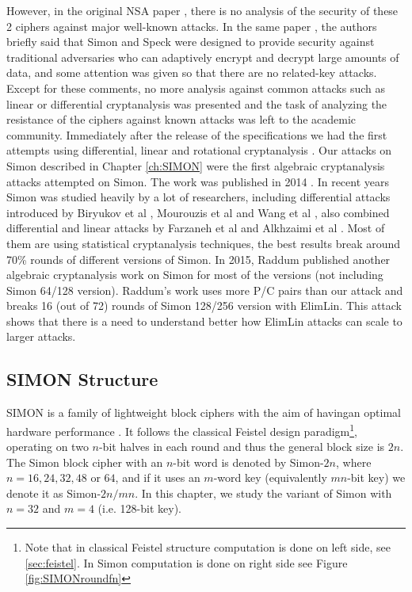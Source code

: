 However, in the original NSA paper \cite{NSAciphers}, there is no analysis of the security of these 2 ciphers against major well-known attacks. In the same paper \cite{NSAciphers}, the authors briefly said that Simon and Speck were designed to provide security against traditional adversaries who can adaptively encrypt and decrypt large amounts of data, and some attention was given so that there are no related-key attacks. Except for these comments, no more analysis against common attacks such as linear or differential cryptanalysis was presented and the task of analyzing the resistance of the ciphers against known attacks was left to the academic community. Immediately after the release of the specifications we had the first attempts using differential, linear and rotational cryptanalysis \cite{simon1,simon2}. Our attacks on Simon described in Chapter \ref{ch:SIMON} were the first algebraic cryptanalysis attacks attempted on Simon. The work was published in 2014 \cite{courtois2014combined}. In recent years Simon was studied heavily by a lot of researchers, including differential attacks introduced by Biryukov et al \cite{simon3}, Mourouzis et al \cite{SIMON6} and Wang et al \cite{SIMON4, SIMON5}, also combined differential and linear attacks by Farzaneh et al \cite{simon1} and Alkhzaimi et al \cite{simon2}. Most of them are using statistical cryptanalysis techniques, the best results break around 70\% rounds of different versions of Simon. In 2015, Raddum \cite{raddum2006new} published another algebraic cryptanalysis work on Simon for most of the versions (not including Simon 64/128 version). Raddum's work uses more P/C pairs than our attack and breaks 16 (out of 72) rounds of Simon 128/256 version with ElimLin.  This attack shows that there is a need to understand better how ElimLin attacks can scale to larger attacks. 

\subsection{SIMON Structure}
SIMON is a family of lightweight block ciphers with the aim of havingan  optimal hardware performance \cite{NSAciphers}.
It follows the classical Feistel design paradigm\footnote{Note that in classical Feistel structure computation is done on left side, see \ref{sec:feistel}. In Simon computation is done on right side see Figure \ref{fig:SIMONroundfn}}, operating on two
$n$-bit halves in each round and thus the general block size is $2n$.
The Simon block cipher with an $n$-bit word is denoted by Simon-$2n$, where
$n=16,24,32,48$ or $64$, and if it uses an $m$-word key (equivalently $mn$-bit
key) we denote it as Simon-$2n/mn$. In this chapter, we study the variant of
Simon with $n=32$ and $m=4$ (i.e. 128-bit key).

